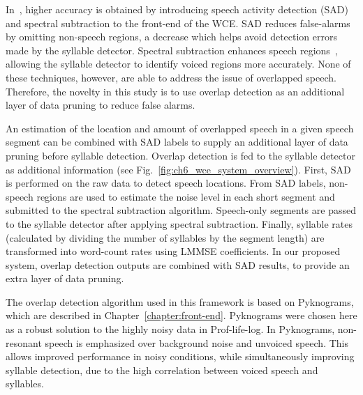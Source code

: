 In~\cite{IS14_wce}, higher accuracy is obtained by introducing speech activity detection (SAD)~\cite{sadjadi2013unsupervised} and spectral subtraction to the front-end of the WCE. 
SAD reduces false-alarms by omitting non-speech regions, a decrease which helps avoid detection errors made by the syllable detector. 
Spectral subtraction enhances speech regions~\cite{boll1979spectralSubtraction}, allowing the syllable detector to identify voiced regions more accurately. 
None of these techniques, however, are able to address the issue of overlapped speech. 
Therefore, the novelty in this study is to use overlap detection as an additional layer of data pruning to reduce false alarms. 

An estimation of the location and amount of overlapped speech in a given speech segment can be combined with SAD labels to supply an additional layer of data pruning before syllable detection. 
Overlap detection is fed to the syllable detector as additional information (see Fig.~\ref{fig:ch6_wce_system_overview}).  
First, SAD is performed on the raw data to detect speech locations. 
From SAD labels, non-speech regions are used to estimate the noise level in each short segment and submitted to the spectral subtraction algorithm. 
Speech-only segments are passed to the syllable detector after applying spectral subtraction. 
Finally, syllable rates (calculated by dividing the number of syllables by the segment length) are transformed into word-count rates using LMMSE coefficients. 
In our proposed system, overlap detection outputs are combined with SAD results, to provide an extra layer of data pruning. 

The overlap detection algorithm used in this framework is based on Pyknograms, which are described in Chapter~\ref{chapter:front-end}. 
Pyknograms were chosen here as a robust solution to the highly noisy data in Prof-life-log. 
In Pyknograms, non-resonant speech is emphasized over background noise and unvoiced speech. 
This allows improved performance in noisy conditions, while simultaneously improving syllable detection, due to the high correlation between voiced speech and syllables. 

